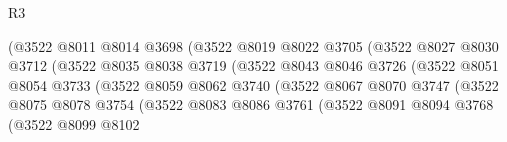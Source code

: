 \begin{lexlean}{R3}
\begin{coremodule}
                                      (@3522
                                        @8011
                                        @8014
                                        @3698
                                        (@3522
                                          @8019
                                          @8022
                                          @3705
                                          (@3522
                                            @8027
                                            @8030
                                            @3712
                                            (@3522
                                              @8035
                                              @8038
                                              @3719
                                              (@3522
                                                @8043
                                                @8046
                                                @3726
                                                (@3522
                                                  @8051
                                                  @8054
                                                  @3733
                                                  (@3522
                                                    @8059
                                                    @8062
                                                    @3740
                                                    (@3522
                                                      @8067
                                                      @8070
                                                      @3747
                                                      (@3522
                                                        @8075
                                                        @8078
                                                        @3754
                                                        (@3522
                                                          @8083
                                                          @8086
                                                          @3761
                                                          (@3522
                                                            @8091
                                                            @8094
                                                            @3768
                                                            (@3522
                                                              @8099
                                                              @8102

\end{coremodule}
\end{lexlean}

